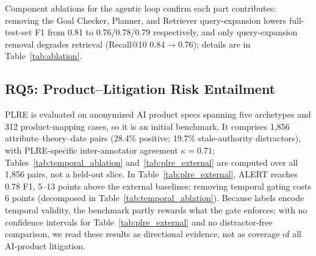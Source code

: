 \begin{table}[t]
\centering
\caption{Edge-error propagation audit. ``Mask $x$\%'' rows also remove $x$\% of extracted negative-treatment edges (closures or down-weights). Effective miss rate $\approx1-0.77(1-x)$ from the extractor's 0.77 recall; $\Delta$F1 is relative to the extractor row.}
\label{tab:edge_sensitivity}
\small
\setlength{\tabcolsep}{4pt}
\end{table}

Component ablations for the agentic loop confirm each part contributes: removing the Goal Checker, Planner, and Retriever query-expansion lowers full-test-set F1 from 0.81 to 0.76/0.78/0.79 respectively, and only query-expansion removal degrades retrieval (Recall@10 $0.84\!\rightarrow\!0.76$); details are in Table~\ref{tab:ablation}.

\subsection{RQ5: Product--Litigation Risk Entailment}

PLRE is evaluated on anonymized AI product specs spanning five archetypes and 312 product-mapping cases, so it is an initial benchmark. It comprises 1{,}856 attribute--theory--date pairs (28.4\% positive; 19.7\% stale-authority distractors), with PLRE-specific inter-annotator agreement $\kappa=0.71$; Tables~\ref{tab:temporal_ablation} and~\ref{tab:plre_external} are computed over all 1{,}856 pairs, not a held-out slice. In Table~\ref{tab:plre_external}, ALERT reaches 0.78 F1, 5--13 points above the external baselines; removing temporal gating costs 6 points (decomposed in Table~\ref{tab:temporal_ablation}). Because labels encode temporal validity, the benchmark partly rewards what the gate enforces; with no confidence intervals for Table~\ref{tab:plre_external} and no distractor-free comparison, we read these results as directional evidence, not as coverage of all AI-product litigation.


